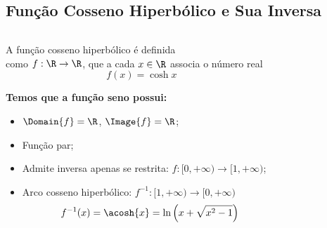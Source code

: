 \subsection{Função Cosseno Hiperbólico e Sua Inversa}
\begin{frame}
  \begin{columns}[onlytextwidth]
    \begin{column}{0.49\textwidth}\vspace{-0.5cm}
      \begin{definition}
        A função cosseno hiperbólico é definida \\como $f:\R\rightarrow\R$, que a cada $x\in\R$ associa o número real
        \begin{equation*}
          f(x) = \cosh{x}
        \end{equation*}
      \end{definition}
      \begin{highlight}
        \textbf{Temos que a função seno possui:}
        \begin{itemize}
          \item $\Domain{f} = \R$, $\Image{f} = \R$;
          \item Função par;
          \item< 2- > Admite inversa apenas se restrita: $f:[0,+\infty)\rightarrow[1,+\infty)$;
          \item<3> Arco cosseno hiperbólico: $f^{-1}:[1,+\infty)\rightarrow[0,+\infty)$\small\vspace*{-0.2cm}
          \begin{equation*}
            f^{-1}(x)=\acosh{x} = \ln{\left(x + \sqrt{x^{2}-1}\right)}\vspace*{-0.2cm}
          \end{equation*}
        \end{itemize}
        \vspace*{-0.5cm}
      \end{highlight}
    \end{column}
    \begin{column}{0.49\textwidth}\vspace*{-0.5cm}
      \begin{figure}
      \end{figure}
    \end{column}
  \end{columns}
\end{frame}

